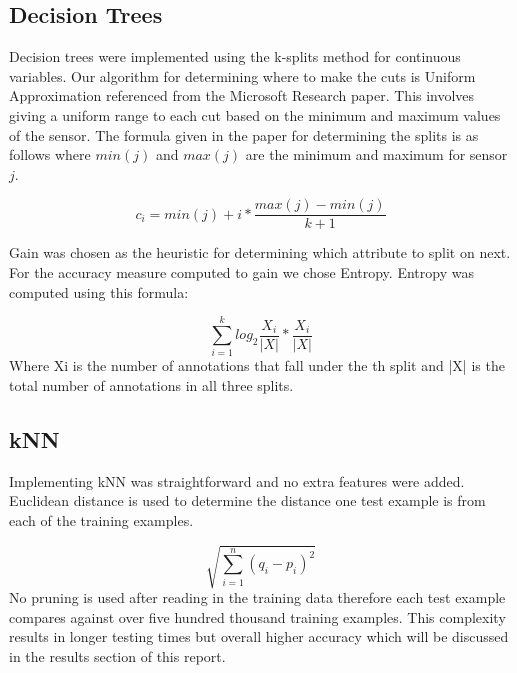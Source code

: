 \documentclass[twoside]{article}
\begin{document}
\begin{multicols}{2}

\subsection{Decision Trees}

Decision trees were implemented using the k-splits method for continuous variables.  Our algorithm for determining where to make the cuts is Uniform Approximation referenced from the Microsoft Research paper.  This involves giving a uniform range to each cut based on the minimum and maximum values of the sensor. The formula given in the paper for determining the splits is as follows where $min(j)$ and $max(j)$ are the minimum and maximum for sensor $j$.

\begin{equation}
\label{splits}
c_i = min(j) + i * \frac{max(j) - min(j)}{k + 1}
\end{equation}

Gain was chosen as the heuristic for determining which attribute to split on next.  For the accuracy measure computed to gain we chose Entropy.  Entropy was computed using this formula:

\begin{equation}
\label{entropy}
\sum_{i=1}^{k} log_2\frac{X_i}{|X|} * \frac{X_i}{|X|} 
\end{equation}
Where Xi is the number of annotations that fall under the th split and |X| is the total number of annotations in all three splits.

\subsection{kNN}

Implementing kNN was straightforward and no extra features were added.  Euclidean distance is used to determine the distance one test example is from each of the training examples.

\begin{equation}
\label{kNN}
\sqrt{\sum_{i=1}^{n} (q_i - p_i)^2}
\end{equation}
No pruning is used after reading in the training data therefore each test example compares against over five hundred thousand training examples.  This complexity results in longer testing times but overall higher accuracy which will be discussed in the results section of this report.


\end{multicols}
\end{document}
